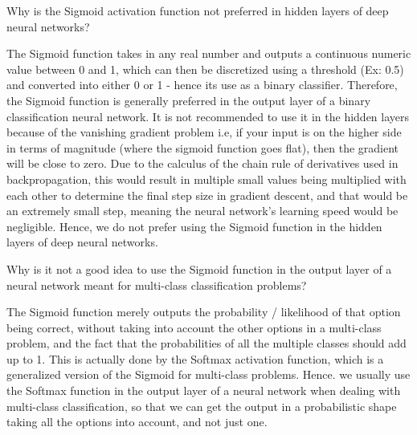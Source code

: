 	\begin{qanda}
		\begin{question}
Why is the Sigmoid activation function not preferred in hidden layers of deep neural networks?
		\end{question}
		\begin{answer}
The Sigmoid function takes in any real number and outputs a continuous numeric value between 0 and 1, which can then be discretized using a threshold (Ex: 0.5) and converted into either 0 or 1 - hence its use as a binary classifier. Therefore, the Sigmoid function is generally preferred in the output layer of a binary classification neural network. It is not recommended to use it in the hidden layers because of the vanishing gradient problem i.e, if your input is on the higher side in terms of magnitude (where the sigmoid function goes flat), then the gradient will be close to zero. Due to the calculus of the chain rule of derivatives used in backpropagation, this would result in multiple small values being multiplied with each other to determine the final step size in gradient descent, and that would be an extremely small step, meaning the neural network's learning speed would be negligible. Hence, we do not prefer using the Sigmoid function in the hidden layers of deep neural networks.
		\end{answer}
	\end{qanda}

	\begin{qanda}
		\begin{question}
Why is it not a good idea to use the Sigmoid function in the output layer of a neural network meant for multi-class classification problems?
		\end{question}
		\begin{answer}
The Sigmoid function merely outputs the probability / likelihood of that option being correct, without taking into account the other options in a multi-class problem, and the fact that the probabilities of all the multiple classes should add up to 1. This is actually done by the Softmax activation function, which is a generalized version of the Sigmoid for multi-class problems. Hence. we usually use the Softmax function in the output layer of a neural network when dealing with multi-class classification, so that we can get the output in a probabilistic shape taking all the options into account, and not just one.
		\end{answer}
	\end{qanda}

